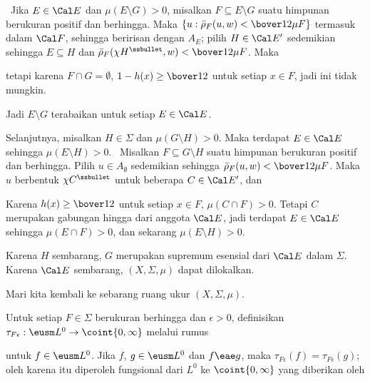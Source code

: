 {\vthsp\Quer\ Jika $E\in \Cal E$ dan $\mu(E\setminus G)>0$, misalkan
$F\subseteq E\setminus G$ suatu himpunan berukuran positif dan berhingga.
Maka $\{u:\bar\rho_F(u,w)<\bover12\mu F\}$ termasuk dalam $\Cal F$,
sehingga beririsan dengan $A_E$; pilih $H\in\Cal E'$ sedemikian sehingga
$E\subseteq H$ dan
$\bar\rho_F(\chi H^{\ssbullet},w)<\bover12\mu F$. Maka


\noindent tetapi karena $F\cap G=\emptyset$, $1-h(x)\ge\bover12$ untuk setiap
$x\in F$, jadi ini tidak mungkin.\ \Bang

Jadi $E\setminus G$ terabaikan untuk setiap $E\in\Cal E$.

Selanjutnya, misalkan $H\in\Sigma$ dan $\mu(G\setminus H)>0$. Maka terdapat
$E\in\Cal E$ sehingga $\mu(E\setminus H)>0$.   \Prf\ Misalkan
$F\subseteq G\setminus H$ suatu himpunan berukuran positif dan berhingga.
Pilih $u\in A_{\emptyset}$ sedemikian sehingga
$\bar\rho_F(u,w)<\bover12\mu F$. Maka $u$ berbentuk
$\chi C^{\ssbullet}$ untuk beberapa $C\in\Cal E'$, dan


\noindent Karena $h(x)\ge\bover12$ untuk setiap $x\in F$, $\mu(C\cap F)>0$.
Tetapi $C$ merupakan gabungan hingga dari anggota $\Cal E$, jadi terdapat
$E\in\Cal E$
sehingga $\mu(E\cap F)>0$, dan sekarang $\mu(E\setminus
H)>0$.\ \Qed

Karena $H$ sembarang, $G$ merupakan supremum esensial dari $\Cal E$ dalam
$\Sigma$. Karena $\Cal E$ sembarang, $(X,\Sigma,\mu)$ dapat
dilokalkan. }%

 Mari
kita kembali ke sebarang ruang ukur $(X,\Sigma,\mu)$.

 Untuk setiap $F\in\Sigma$ berukuran berhingga dan
$\epsilon>0$, definisikan $\tau_{F\epsilon}:\eusm L^0\to\coint{0,\infty}$
melalui rumus


\noindent untuk $f\in\eusm L^0$. Jika $f$, $g\in\eusm L^0$
dan $f\eae g$, maka $\tau_{F\epsilon}(f)=\tau_{F\epsilon}(g)$;
oleh karena itu diperoleh fungsional dari $L^0$ ke $\coint{0,\infty}$
yang diberikan oleh


